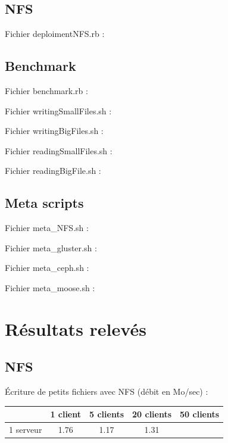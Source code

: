 \documentclass[12pt]{report}
\begin{document}
			\section{NFS}
				Fichier deploimentNFS.rb :
				
			\section{Benchmark}
				Fichier benchmark.rb :
				

				Fichier writingSmallFiles.sh :
				

				Fichier writingBigFiles.sh :
				

				Fichier readingSmallFiles.sh :
				

				Fichier readingBigFile.sh :
				
			\section{Meta scripts}
				Fichier meta\_NFS.sh :
				

				Fichier meta\_gluster.sh :
				

				Fichier meta\_ceph.sh :
				

				Fichier meta\_moose.sh :
				

		\chapter{Résultats relevés}

			\section{NFS}

			Écriture de petits fichiers avec NFS (débit en Mo/sec) :

			\begin{tabular}{|l|c|c|c|c|}
				\hline
				& 1 client & 5 clients & 20 clients & 50 clients \\
				\hline
				1 serveur & 1.76 & 1.17 & 1.31 & \\
				\hline
			\end{tabular}\\\\
\end{document}
